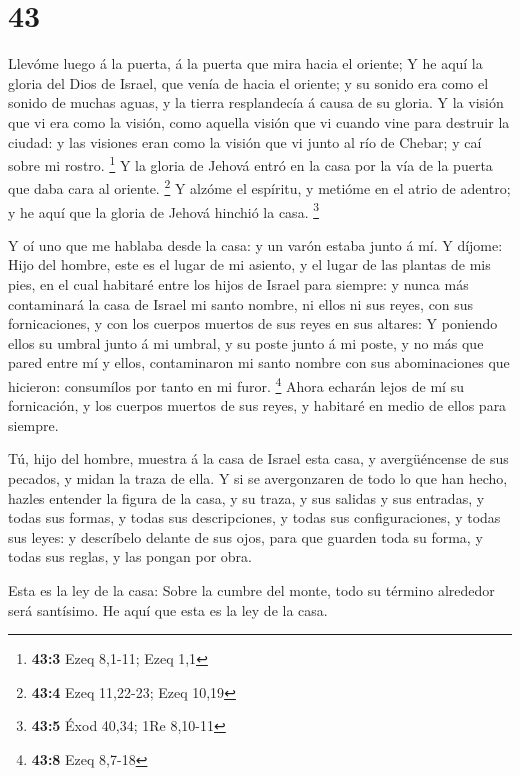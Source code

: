 \hypertarget{section-42}{%
\section{43}\label{section-42}}

 Llevóme luego á la puerta, á la puerta que mira hacia el
oriente;  Y he aquí la gloria del Dios de Israel, que
venía de hacia el oriente; y su sonido era como el sonido de muchas
aguas, y la tierra resplandecía á causa de su gloria.  Y
la visión que vi era como la visión, como aquella visión que vi cuando
vine para destruir la ciudad: y las visiones eran como la visión que vi
junto al río de Chebar; y caí sobre mi rostro. \footnote{\textbf{43:3}
  Ezeq 8,1-11; Ezeq 1,1}  Y la gloria de Jehová entró en
la casa por la vía de la puerta que daba cara al oriente. \footnote{\textbf{43:4}
  Ezeq 11,22-23; Ezeq 10,19}  Y alzóme el espíritu, y
metióme en el atrio de adentro; y he aquí que la gloria de Jehová
hinchió la casa. \footnote{\textbf{43:5} Éxod 40,34; 1Re 8,10-11}

 Y oí uno que me hablaba desde la casa: y un varón estaba
junto á mí.  Y díjome: Hijo del hombre, este es el lugar
de mi asiento, y el lugar de las plantas de mis pies, en el cual
habitaré entre los hijos de Israel para siempre: y nunca más contaminará
la casa de Israel mi santo nombre, ni ellos ni sus reyes, con sus
fornicaciones, y con los cuerpos muertos de sus reyes en sus altares:
 Y poniendo ellos su umbral junto á mi umbral, y su poste
junto á mi poste, y no más que pared entre mí y ellos, contaminaron mi
santo nombre con sus abominaciones que hicieron: consumílos por tanto en
mi furor. \footnote{\textbf{43:8} Ezeq 8,7-18}  Ahora
echarán lejos de mí su fornicación, y los cuerpos muertos de sus reyes,
y habitaré en medio de ellos para siempre.

 Tú, hijo del hombre, muestra á la casa de Israel esta
casa, y avergüéncense de sus pecados, y midan la traza de ella.
 Y si se avergonzaren de todo lo que han hecho, hazles
entender la figura de la casa, y su traza, y sus salidas y sus entradas,
y todas sus formas, y todas sus descripciones, y todas sus
configuraciones, y todas sus leyes: y descríbelo delante de sus ojos,
para que guarden toda su forma, y todas sus reglas, y las pongan por
obra.

 Esta es la ley de la casa: Sobre la cumbre del monte,
todo su término alrededor será santísimo. He aquí que esta es la ley de
la casa.

